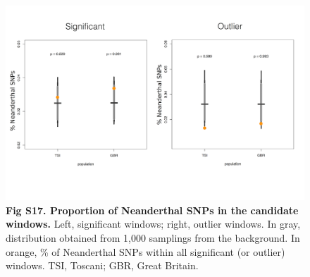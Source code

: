 \begin{refsection}
\begin{otherlanguage}{english}
\begin{figure}[!htb]
\centering
\includegraphics[]{chap2_folder/supp_figures/S17_Fig.png}
\caption*{\textbf{Fig S17. Proportion of Neanderthal SNPs in the candidate windows.}
Left, significant windows; right, outlier windows. In gray, distribution obtained from 1,000 samplings from the background. In orange, \% of Neanderthal SNPs within all significant (or outlier) windows. TSI, Toscani; GBR, Great Britain.
}
\end{figure}
%
%


\end{otherlanguage}
\end{refsection}
